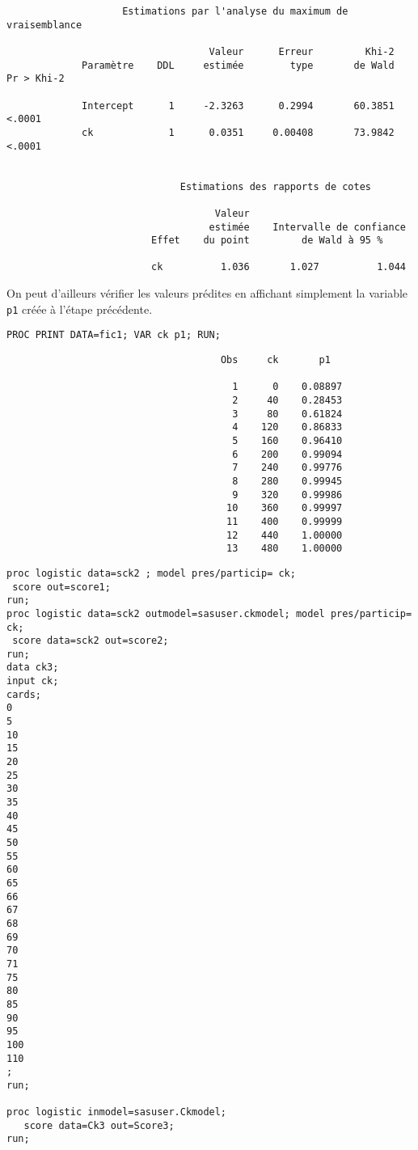 \begin{verbatim}
                    Estimations par l'analyse du maximum de vraisemblance

                                   Valeur      Erreur         Khi-2
             Paramètre    DDL     estimée        type       de Wald    Pr > Khi-2

             Intercept      1     -2.3263      0.2994       60.3851        <.0001
             ck             1      0.0351     0.00408       73.9842        <.0001


                              Estimations des rapports de cotes

                                    Valeur
                                   estimée    Intervalle de confiance
                         Effet    du point         de Wald à 95 %

                         ck          1.036       1.027          1.044
\end{verbatim}

On peut d'ailleurs vérifier les valeurs prédites en affichant simplement la
variable \texttt{p1} créée à l'étape précédente.
\begin{verbatim}
PROC PRINT DATA=fic1; VAR ck p1; RUN;
\end{verbatim}

\begin{verbatim}
                                     Obs     ck       p1

                                       1      0    0.08897
                                       2     40    0.28453
                                       3     80    0.61824
                                       4    120    0.86833
                                       5    160    0.96410
                                       6    200    0.99094
                                       7    240    0.99776
                                       8    280    0.99945
                                       9    320    0.99986
                                      10    360    0.99997
                                      11    400    0.99999
                                      12    440    1.00000
                                      13    480    1.00000
\end{verbatim}

\begin{verbatim}
proc logistic data=sck2 ; model pres/particip= ck;
 score out=score1;
run;
proc logistic data=sck2 outmodel=sasuser.ckmodel; model pres/particip= ck;
 score data=sck2 out=score2;
run;
data ck3;
input ck;
cards;
0
5
10
15
20
25
30
35
40
45
50
55
60
65
66
67
68
69
70
71
75
80
85
90
95
100
110
;
run;

proc logistic inmodel=sasuser.Ckmodel;
   score data=Ck3 out=Score3;
run;
\end{verbatim}

